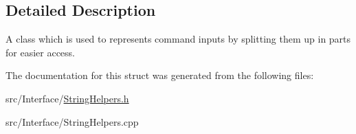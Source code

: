 \subsection{Detailed Description}
A class which is used to represents command inputs by splitting them up in parts for easier access. 

The documentation for this struct was generated from the following files\+:\begin{DoxyCompactItemize}
\item 
src/\+Interface/\hyperlink{StringHelpers_8h}{String\+Helpers.\+h}\item 
src/\+Interface/String\+Helpers.\+cpp\end{DoxyCompactItemize}
